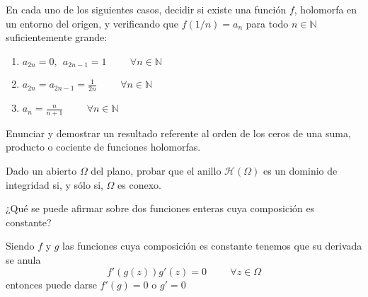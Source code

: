 \begin{ejer}
	En cada uno de los siguientes casos, decidir si existe una función $f$, holomorfa en un entorno del origen, y verificando que $f(1/n)=a_n$ para todo $n\in\mathbb{N}$ suficientemente grande:
	\begin{enumerate}[label=(\alph*)]
		\item $a_{2n} = 0, \ \ a_{2n-1}=1 \hspace{1cm} \forall n\in\mathbb{N}$
		\item $a_{2n} = a_{2n-1} = \frac{1}{2n} \hspace{1cm} \forall n\in\mathbb{N}$
		\item $a_n = \frac{n}{n+1} \hspace{1cm} \forall n\in\mathbb{N}$
	\end{enumerate}
\end{ejer}

\begin{ejer}
	Enunciar y demostrar un resultado referente al orden de los ceros de una suma, producto o cociente de funciones holomorfas.
\end{ejer}

\begin{ejer}
	Dado un abierto $\Omega$ del plano, probar que el anillo $\mathcal{H}(\Omega)$ es un dominio de integridad si, y sólo si, $\Omega$ es conexo.
\end{ejer}


\begin{ejer}
	¿Qué se puede afirmar sobre dos funciones enteras cuya composición es constante?
\end{ejer}
\begin{sol}
	Siendo $f$ y $g$ las funciones cuya composición es constante tenemos que su derivada se anula
	$$f'(g(z)) g'(z) = 0 \hspace{1cm} \forall z\in\Omega$$
	entonces puede darse
	$f'(g)=0$ o $g'=0$
\end{sol}

